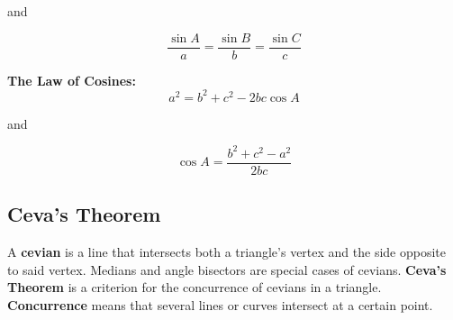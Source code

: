 \documentclass{article}
\begin{document}
            \noindent and

            \begin{equation*}
                \frac{\sin{A}}{a} = \frac{\sin{B}}{b} = \frac{\sin{C}}{c}
            \end{equation*}

            \begin{center}
            \end{center}

            \noindent \color{purple} \textbf{The Law of Cosines:} \color{black} \\

            \begin{equation*}
                a^2 = b^2 + c^2 -2bc \cos{A}
            \end{equation*}

            \noindent and

            \begin{equation*}
                \cos{A}=\frac{b^2+c^2-a^2}{2bc}
            \end{equation*}

        \subsection{Ceva's Theorem}
            A \textbf{cevian} is a line that intersects both a triangle's vertex and the side
            opposite to said vertex. Medians and angle bisectors are special cases of cevians.
            \color{purple} \textbf{Ceva's Theorem} \color{black} is a criterion for the concurrence
            of cevians in a triangle. \textbf{Concurrence} means that several lines or curves
            intersect at a certain point. \\
\end{document}
